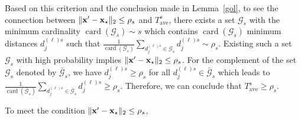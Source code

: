 \documentclass[12pt,draftcls,onecolumn]{IEEEtran}
\begin{document}
Based on this criterion and the conclusion made in Lemma~\ref{gol}, to see the connection between $\|\mathbf{x}^{\prime}-\mathbf{x}_{\star}\|_2\leq\rho_s$ and $T_{\mathrm{ave}}^{s}$, there exists a set $\mathcal{G}_s$ with the minimum cardinality $\operatorname{card}(\mathcal{G}_s)\sim s$ which contains $\operatorname{card}(\mathcal{G}_s)$ minimum distances $d_j^{(\ell)s}$ such that $\frac{1}{\operatorname{card}(\mathcal{G}_s)}\sum_{d_j^{(\ell)s}\in\mathcal{G}_s}d_j^{(\ell)s}\sim\rho_s$. Existing such a set $\mathcal{G}_s$ with high probability implies $\|\mathbf{x}^{\prime}-\mathbf{x}_{\star}\|_2\leq\rho_s$. For the complement of the set $\mathcal{G}_s$ denoted by $\bar{\mathcal{G}}_s$, we have $d_j^{(\ell)s}\geq\rho_s$ for all $d_j^{(\ell)s}\in\bar{\mathcal{G}}_s$ which leads to $\frac{1}{\operatorname{card}(\bar{\mathcal{G}}_s)}\sum_{d_j^{(\ell)s}\in\bar{\mathcal{G}}_s}d_j^{(\ell)s}\geq\rho_s$. Therefore, we can conclude that $T_{\mathrm{ave}}^{s}\geq\rho_s$.

To meet the condition $\|\mathbf{x}^{\prime}-\mathbf{x}_{\star}\|_2\leq\rho_s$,
\end{document}
